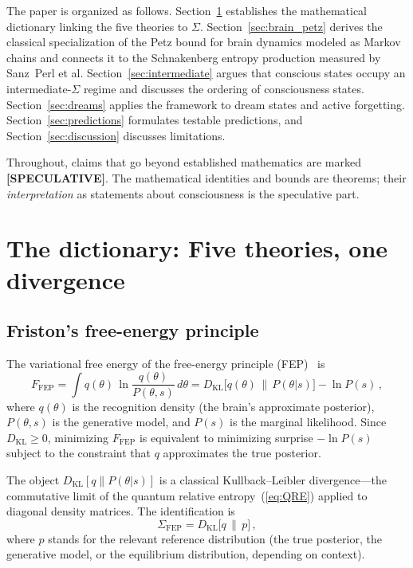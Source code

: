\documentclass[prl,twocolumn,superscriptaddress,longbibliography,floatfix]{revtex4-2}
\newcommand{\DKL}{D_{\mathrm{KL}}}
\newcommand{\Ffriston}{F_{\mathrm{FEP}}}
\begin{document}
The paper is organized as follows.  Section~\ref{sec:dictionary}
establishes the mathematical dictionary linking the five theories to
$\Sigma$.  Section~\ref{sec:brain_petz} derives the classical
specialization of the Petz bound for brain dynamics modeled as
Markov chains and connects it to the Schnakenberg entropy production
measured by Sanz~Perl et al.  Section~\ref{sec:intermediate} argues
that conscious states occupy an intermediate-$\Sigma$ regime and
discusses the ordering of consciousness states.
Section~\ref{sec:dreams} applies the framework to dream states and
active forgetting.  Section~\ref{sec:predictions} formulates
testable predictions, and Section~\ref{sec:discussion} discusses
limitations.

Throughout, claims that go beyond established mathematics are
marked \textbf{[SPECULATIVE]}.  The mathematical identities and
bounds are theorems; their \emph{interpretation} as statements about
consciousness is the speculative part.


\section{The dictionary: Five theories, one divergence}
\label{sec:dictionary}

\subsection{Friston's free-energy principle}
\label{subsec:friston}

The variational free energy of the free-energy principle
(FEP)~\cite{Friston2019,Fields2022} is
\begin{equation}
\Ffriston = \int q(\theta)\,\ln\frac{q(\theta)}{P(\theta,s)}\,
  d\theta
  = \DKL\!\bigl[q(\theta)\,\big\|\,P(\theta|s)\bigr]
  - \ln P(s)\,,
\label{eq:FEP}
\end{equation}
where $q(\theta)$ is the recognition density (the brain's
approximate posterior), $P(\theta,s)$ is the generative model,
and $P(s)$ is the marginal likelihood.  Since
$\DKL \geq 0$, minimizing $\Ffriston$ is equivalent to minimizing
surprise $-\ln P(s)$ subject to the constraint that $q$ approximates
the true posterior.

The object $\DKL[q\|P(\theta|s)]$ is a classical
Kullback--Leibler divergence---the commutative limit of the
quantum relative entropy~(\ref{eq:QRE}) applied to diagonal density
matrices.  The identification is
\begin{equation}
\Sigma_{\mathrm{FEP}} = \DKL\!\bigl[q\,\big\|\,p\bigr]\,,
\label{eq:sigma_FEP}
\end{equation}
where $p$ stands for the relevant reference distribution
(the true posterior, the generative model, or the equilibrium
distribution, depending on context).
\end{document}
